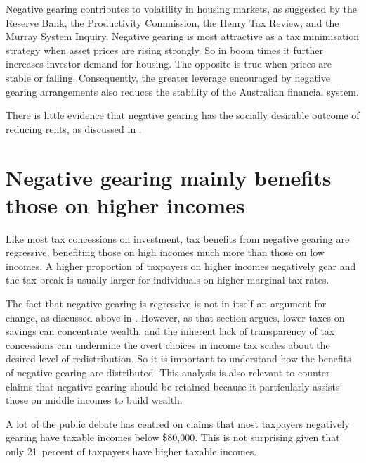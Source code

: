 \documentclass{grattan}\usepackage[]{graphicx}\usepackage[]{color}
\begin{document}
Negative gearing contributes to volatility in housing markets, as suggested by the Reserve Bank, the Productivity Commission, the Henry Tax Review, and the Murray System Inquiry.  Negative gearing is most attractive as a tax minimisation strategy when asset prices are rising strongly. So in boom times it further increases investor demand for housing. The opposite is true when prices are stable or falling. Consequently, the greater leverage encouraged by negative gearing arrangements also reduces the stability of the Australian financial system.

There is little evidence that negative gearing has the socially desirable outcome of reducing rents, as discussed in .

\section{Negative gearing mainly benefits those on higher incomes}
Like most tax concessions on investment, tax benefits from negative gearing are regressive, benefiting those on high incomes much more than those on low incomes. A higher proportion of taxpayers on higher incomes negatively gear and the tax break is usually larger for individuals on higher marginal tax rates. 

The fact that negative gearing is regressive is not in itself an argument for change, as discussed above in . However, as that section argues, lower taxes on savings can concentrate wealth, and the inherent lack of transparency of tax concessions can undermine the overt choices in income tax scales about the desired level of redistribution. So it is important to understand how the benefits of negative gearing are distributed. This analysis is also relevant to counter claims that negative gearing should be retained because it particularly assists those on middle incomes to build wealth. 



A lot of the public debate has centred on claims that most taxpayers negatively gearing have taxable incomes below \$80,000. This is not surprising given that only 21~percent of taxpayers have higher taxable incomes. 
\end{document}
